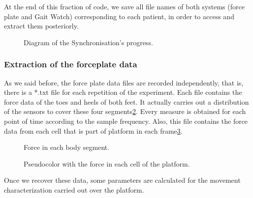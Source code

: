 At the end of this fraction of code, we save all file names of both systems (force plate and Gait Watch) corresponding to each patient, in order to access and extract them posteriorly.

\begin{figure}[H]
	\centering
	\caption{Diagram of the Synchronisation's progress.}
	\label{fig:diagramSynchronisation}
\end{figure}


\subsubsection{Extraction of the forceplate data}
As we said before, the  force plate data files are recorded independently, that is, there is a *.txt file for each repetition of the experiment.
Each file contains the force data of the toes and heels of both feet. It actually carries out a distribution of the sensors to cover these four segments\ref{fig:Force4signals}. Every measure is obtained for each point of time according to the sample frequency. Also, this file contains the force data from each cell that is part of platform in each frame\ref{fig:pseudocolor}.

\begin{figure}[H]
	\centering
	\caption{Force in each body segment.}
	\label{fig:Force4signals}
\end{figure}

\begin{figure}[H]
	\centering
	\caption{Pseudocolor with the force in each cell of the platform.}
	\label{fig:pseudocolor}
\end{figure}

Once we recover these data, some parameters are calculated for the movement characterization carried out over the platform. 

